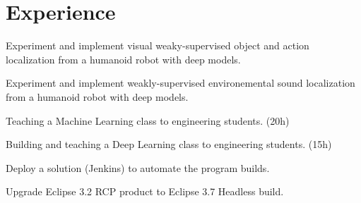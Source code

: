 \documentclass[letterpaper]{deedy-resume} %
\begin{document}
\begin{minipage}[t]{0.66\textwidth} %


\section{Experience}


\vspace{\topsep} %
\begin{tightitemize}
    \item Experiment and implement visual weaky-supervised object and action localization from a humanoid robot with deep models.
    \item Experiment and implement weakly-supervised environemental sound localization from a humanoid robot with deep models.
\end{tightitemize}

\sectionspace %



\begin{tightitemize}
    \item Teaching a Machine Learning class to engineering students. (20h)
    \item Building and teaching a Deep Learning class to engineering students. (15h)
\end{tightitemize}

\sectionspace %



\vspace{\topsep} %
\begin{tightitemize}
    \item Deploy a solution (Jenkins) to automate the program builds.
    \item Upgrade Eclipse 3.2 RCP product to Eclipse 3.7 Headless build.
\end{tightitemize}


\end{minipage}
\end{document}
